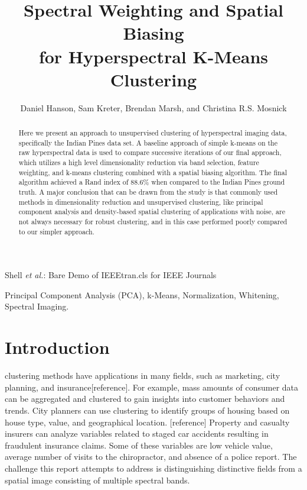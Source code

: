 \documentclass[journal]{IEEEtran}
\begin{document}
\title{Spectral Weighting and Spatial Biasing\\ for Hyperspectral K-Means Clustering}


\author{Daniel Hanson, Sam Kreter, Brendan Marsh, and Christina R.S. Mosnick}

{Shell \MakeLowercase{\textit{et al.}}: Bare Demo of IEEEtran.cls for IEEE Journals}

\maketitle

\begin{abstract}
Here we present an approach to unsupervised clustering of hyperspectral imaging data, specifically the Indian Pines data set. A baseline approach of simple k-means on the raw hyperspectral data is used to compare successive iterations of our final approach, which utilizes a high level dimensionality reduction via band selection, feature weighting, and k-means clustering combined with a spatial biasing algorithm. The final algorithm achieved a Rand index of 88.6\% when compared to the Indian Pines ground truth. A major conclusion that can be drawn from the study is that commonly used methods in dimensionality reduction and unsupervised clustering, like principal component analysis and density-based spatial clustering of applications with noise, are not always necessary for robust clustering, and in this case performed poorly compared to our simpler approach.
\end{abstract}

\begin{IEEEkeywords}
    Principal Component Analysis (PCA), k-Means, Normalization, Whitening, Spectral Imaging.
\end{IEEEkeywords}

\IEEEpeerreviewmaketitle

\section{Introduction}

 clustering methods have applications in many fields, such as marketing, city planning, and insurance[reference].  For example, mass amounts of consumer data can be aggregated and clustered to gain insights into customer behaviors and trends.  City planners can use clustering to identify groups of housing based on house type, value, and geographical location.  [reference]  Property and casualty insurers can analyze variables related to staged car accidents resulting in fraudulent insurance claims.  Some of these variables are low vehicle value, average number of visits to the chiropractor, and absence of a police report.  The challenge this report attempts to address is distinguishing distinctive fields from a spatial image consisting of multiple spectral bands.\\
\end{document}
